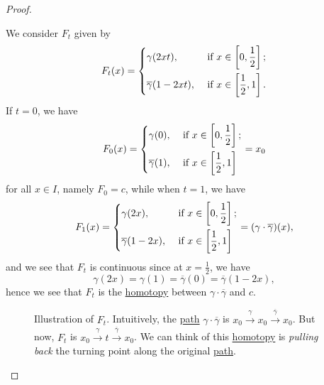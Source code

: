 \begin{proof}
\begin{itemize}
		      \par We consider \(F_t\) given by
		      \[
			      F_{t}(x) = \begin{dcases}
				      \gamma(2xt),              & \text{ if } x\in\left[0, \frac{1}{2}\right]; \\
				      \overline{\gamma}(1-2xt), & \text{ if } x\in\left[\frac{1}{2}, 1\right].
			      \end{dcases}
		      \]
		      If \(t = 0\), we have
		      \[
			      F_{0}(x) = \begin{dcases}
				      \gamma(0),            & \text{ if } x\in\left[0, \frac{1}{2}\right]; \\
				      \overline{\gamma}(1), & \text{ if } x\in\left[\frac{1}{2}, 1\right]
			      \end{dcases} = x_0
		      \]
		      for all \(x\in I\), namely \(F_0 = c\), while when \(t = 1\), we have
		      \[
			      F_{1}(x) = \begin{dcases}
				      \gamma(2x),              & \text{ if } x\in\left[0, \frac{1}{2}\right]; \\
				      \overline{\gamma}(1-2x), & \text{ if } x\in\left[\frac{1}{2}, 1\right]
			      \end{dcases} = (\gamma\cdot \overline{\gamma})(x),
		      \]
		      and we see that \(F_t\) is continuous since at \(x = \frac{1}{2}\), we have
		      \[
			      \gamma(2x) = \gamma(1) = \overline{\gamma} (0) = \overline{\gamma} (1 - 2x),
		      \]
		      hence we see that \(F_{t}\) is the \hyperref[def:homotopy]{homotopy} between \(\gamma\cdot \overline{\gamma} \) and \(c\).
		      \begin{figure}[H]
			      \centering
			      \caption{Illustration of \(F_t\). Intuitively, the \hyperref[path]{path} \(\gamma\cdot \overline{\gamma}\) is \(x_0 \overset{\gamma}{\to} x_0 \overset{\overline{\gamma} }{\to} x_0\).
				      But now, \(F_t\) is \(x_0 \overset{\gamma}{\to} t \overset{\overline{\gamma} }{\to} x_0\). We can think of this \hyperref[def:homotopy]{homotopy} is \emph{pulling back}
				      the turning point along the original \hyperref[path]{path}.}
			      \label{fig:def:fundamental-group}
		      \end{figure}
	\end{itemize}
\end{proof}

